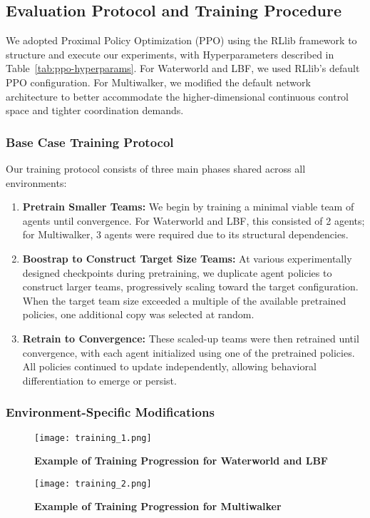 \documentclass{article}
\begin{document}
\subsection{Evaluation Protocol and Training Procedure}

We adopted Proximal Policy Optimization (PPO)\cite{schulman2017} using the RLlib 
framework to structure and execute our experiments, with Hyperparameters described in
Table~\ref{tab:ppo-hyperparams}. For Waterworld and LBF, 
we used RLlib's default PPO configuration. For Multiwalker, we modified the default 
network architecture to better accommodate the higher-dimensional continuous control space and 
tighter coordination demands.

\subsubsection{Base Case Training Protocol}

Our training protocol consists of three main phases shared across all environments:
\begin{enumerate}
    \item \textbf{Pretrain Smaller Teams:} We begin by training a minimal viable team of 
        agents until convergence. For Waterworld and LBF, this consisted of 2 agents; 
        for Multiwalker, 3 agents were required due to its structural dependencies.
    \item \textbf{Boostrap to Construct Target Size Teams:} At various experimentally 
        designed checkpoints during pretraining, we duplicate agent policies to construct 
        larger teams, progressively scaling toward the target configuration. 
        When the target team size exceeded a multiple of the available pretrained policies, 
        one additional copy was selected at random.
    \item \textbf{Retrain to Convergence:} These scaled-up teams were then retrained until 
        convergence, with each agent initialized using one of the pretrained policies. 
        All policies continued to update independently, allowing behavioral differentiation to 
        emerge or persist.
\end{enumerate}

\subsubsection{Environment-Specific Modifications}

\begin{figure}[!h]
    \centering
    \texttt{[image: training\_1.png]}
    \caption{\textbf{Example of Training Progression for Waterworld and LBF} }
    \label{fig:training_1}
\end{figure}
\begin{figure}[!h]
    \centering
    \texttt{[image: training\_2.png]}
    \caption{\textbf{Example of Training Progression for Multiwalker} }
    \label{fig:training_2}
\end{figure}
\end{document}
